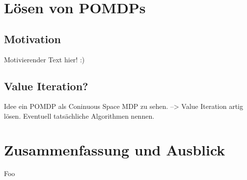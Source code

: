 \documentclass[a4paper]{IEEEtran}
\begin{document}
\section{Lösen von POMDPs}
\subsection{Motivation}
Motivierender Text hier! :)

\subsection{Value Iteration?}
Idee ein POMDP als Coninuous Space MDP zu sehen. --> Value Iteration artig lösen. Eventuell tatsächliche Algorithmen nennen.

\section{Zusammenfassung und Ausblick}
Foo



\end{document}

